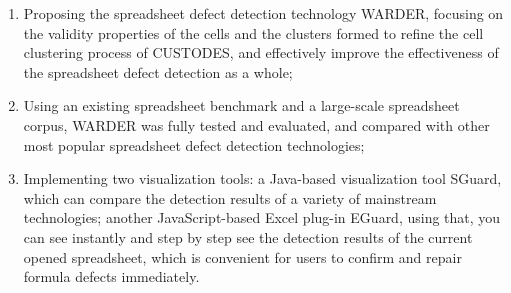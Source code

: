 \begin{englishabstract}
\begin{enumerate}
    \item Proposing the spreadsheet defect detection technology WARDER, focusing on the validity properties of the cells and the clusters formed to refine the cell clustering process of CUSTODES, and effectively improve the effectiveness of the spreadsheet defect detection as a whole;
    \item Using an existing spreadsheet benchmark and a large-scale spreadsheet corpus, WARDER was fully tested and evaluated, and compared with other most popular spreadsheet defect detection technologies;
    \item Implementing two visualization tools: a Java-based visualization tool SGuard, which can compare the detection results of a variety of mainstream technologies; another JavaScript-based Excel plug-in EGuard, using that, you can see instantly and step by step see the detection results of the current opened spreadsheet, which is convenient for users to confirm and repair formula defects immediately.
\end{enumerate}


\end{englishabstract}